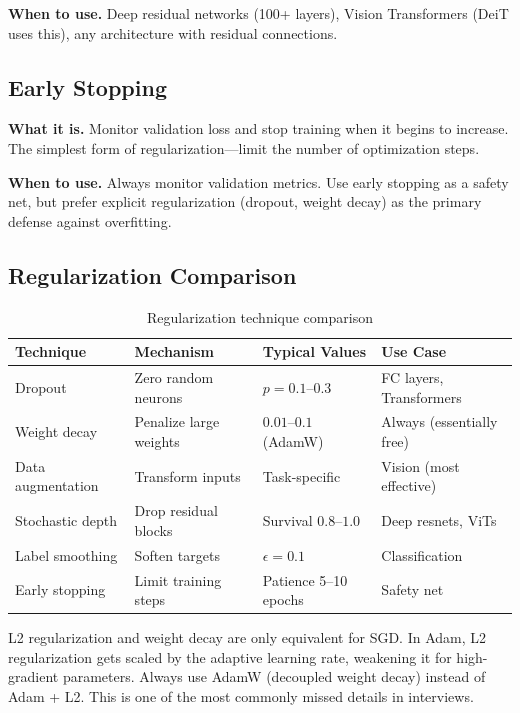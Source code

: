 \textbf{When to use.} Deep residual networks (100+ layers), Vision Transformers (DeiT uses this), any architecture with residual connections.

\subsection{Early Stopping}

\textbf{What it is.} Monitor validation loss and stop training when it begins to increase. The simplest form of regularization---limit the number of optimization steps.

\textbf{When to use.} Always monitor validation metrics. Use early stopping as a safety net, but prefer explicit regularization (dropout, weight decay) as the primary defense against overfitting.

\subsection{Regularization Comparison}

\begin{table}[H]
\centering
\caption{Regularization technique comparison}
\begin{tabularx}{\textwidth}{lXlX}
\toprule
\textbf{Technique} & \textbf{Mechanism} & \textbf{Typical Values} & \textbf{Use Case} \\
\midrule
Dropout & Zero random neurons & $p = 0.1$--$0.3$ & FC layers, Transformers \\
Weight decay & Penalize large weights & $0.01$--$0.1$ (AdamW) & Always (essentially free) \\
Data augmentation & Transform inputs & Task-specific & Vision (most effective) \\
Stochastic depth & Drop residual blocks & Survival $0.8$--$1.0$ & Deep resnets, ViTs \\
Label smoothing & Soften targets & $\epsilon = 0.1$ & Classification \\
Early stopping & Limit training steps & Patience 5--10 epochs & Safety net \\
\bottomrule
\end{tabularx}
\end{table}

\begin{warningbox}
L2 regularization and weight decay are only equivalent for SGD. In Adam, L2 regularization gets scaled by the adaptive learning rate, weakening it for high-gradient parameters. Always use AdamW (decoupled weight decay) instead of Adam + L2. This is one of the most commonly missed details in interviews.
\end{warningbox}

